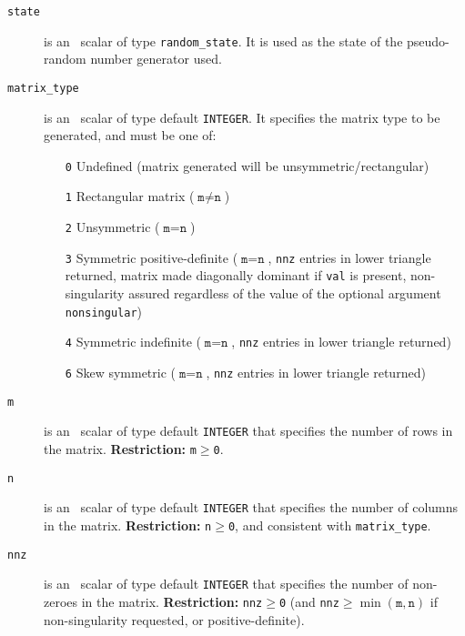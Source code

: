 \documentclass{spral}
\begin{document}
\vspace*{-3mm}
\begin{description}

\item[\texttt{state}] is an \intentinout\ scalar of type {\tt random\_state}.
It is used as the state of the pseudo-random number generator used.

\item[\texttt{matrix\_type}] is an \intentin\ scalar of type default
   {\tt INTEGER}. It specifies the matrix type to be generated, and must be one
   of:
   \begin{itemize}
      \item[\tt 0] Undefined (matrix generated will be unsymmetric/rectangular)
      \item[\tt 1] Rectangular matrix ($\texttt{m}\ne\texttt{n}$)
      \item[\tt 2] Unsymmetric ($\texttt{m}=\texttt{n}$)
      \item[\tt 3] Symmetric positive-definite ($\texttt{m}=\texttt{n}$,
         \texttt{nnz} entries in lower triangle returned, matrix made
         diagonally dominant if \texttt{val} is present, non-singularity
         assured regardless of the value of the optional argument
         {\tt nonsingular})
      \item[\tt 4] Symmetric indefinite ($\texttt{m}=\texttt{n}$,
         \texttt{nnz} entries in lower triangle returned)
      \item[\tt 6] Skew symmetric ($\texttt{m}=\texttt{n}$,
         \texttt{nnz} entries in lower triangle returned)
   \end{itemize}

\item[\texttt{m}] is an \intentin\ scalar of type default {\tt INTEGER} that
   specifies the number of rows in the matrix.
{\bf Restriction:} {\tt m$\geq$0}.

\item[\texttt{n}] is an \intentin\ scalar of type default {\tt INTEGER} that
   specifies the number of columns in the matrix.
{\bf Restriction:} {\tt n$\geq$0}, and consistent with \texttt{matrix\_type}.

\item[\texttt{nnz}] is an \intentin\ scalar of type default {\tt INTEGER} that
   specifies the number of non-zeroes in the matrix.
{\bf Restriction:} {\tt nnz$\geq$0} (and \texttt{nnz}$\geq\min(\texttt{m},\texttt{n})$ if non-singularity requested, or positive-definite).


\end{description}
\end{document}

